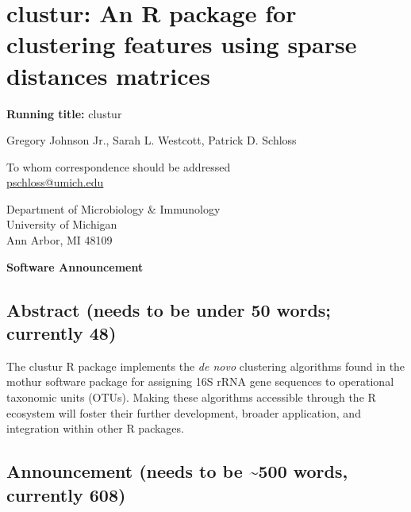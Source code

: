 \documentclass[
  11pt,
]{article}
\author{}
\date{}
\begin{document}
\raggedright

\section{clustur: An R package for clustering features using sparse
distances
matrices}\label{clustur-an-r-package-for-clustering-features-using-sparse-distances-matrices}

\vspace{20mm}

\textbf{Running title:} clustur

\vspace{20mm}

Gregory Johnson Jr.\text, Sarah L. Westcott, Patrick D.
Schloss\textsuperscript{\textdagger}

\vspace{25mm}

\textdagger To whom correspondence should be addressed\\
\href{mailto:pschloss@umich.edu}{pschloss@umich.edu}

\vspace{10mm}

Department of Microbiology \& Immunology\\
University of Michigan\\
Ann Arbor, MI 48109

\vspace{20mm}

\textbf{Software Announcement}

\newpage

\subsection{Abstract (needs to be under 50 words; currently
48)}\label{abstract-needs-to-be-under-50-words-currently-48}

The clustur R package implements the \emph{de novo} clustering
algorithms found in the mothur software package for assigning 16S rRNA
gene sequences to operational taxonomic units (OTUs). Making these
algorithms accessible through the R ecosystem will foster their further
development, broader application, and integration within other R
packages.

\newpage

\subsection{Announcement (needs to be \textasciitilde500 words,
currently 608)}\label{announcement-needs-to-be-500-words-currently-608}
\end{document}
